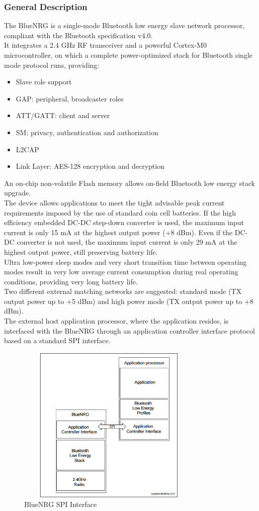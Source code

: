 \subsubsection{General Description}
The BlueNRG is a single-mode Bluetooth low energy slave network processor, compliant with the Bluetooth specification v4.0.\\
It integrates a 2.4 GHz RF transceiver and a powerful Cortex-M0 microcontroller, on which a complete power-optimized stack for Bluetooth single mode protocol runs, providing:
\begin{itemize}
	\item Slave role support
	\item GAP: peripheral, broadcaster roles
	\item ATT/GATT: client and server
	\item SM: privacy, authentication and authorization
	\item L2CAP
	\item Link Layer: AES-128 encryption and decryption
\end{itemize}
An on-chip non-volatile Flash memory allows on-field Bluetooth low energy stack upgrade.\\
The device allows applications to meet the tight advisable peak current requirements imposed by the use of standard coin cell batteries. If the high efficiency embedded DC-DC step-down converter is used, the maximum input current is only 15 mA at the highest output power (+8 dBm). Even if the DC-DC converter is not used, the maximum input current is only 29 mA at the highest output power, still preserving battery life.\\
Ultra low-power sleep modes and very short transition time between operating modes result in very low average current consumption during real operating conditions, providing very long battery life.\\
Two different external matching networks are suggested: standard mode (TX output power up to +5 dBm) and high power mode (TX output power up to +8 dBm).\\
The external host application processor, where the application resides, is interfaced with the BlueNRG through an application controller interface protocol based on a standard SPI interface.
\begin{figure}[ht]
	\centering
	\includegraphics[width=3.5in, height=3in]{images/bluenrg_spi.png}
	\caption{BlueNRG SPI Interface}
\end{figure}
